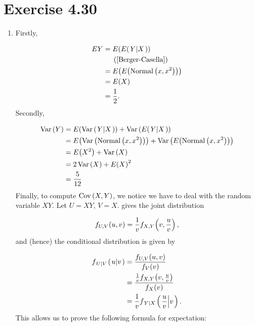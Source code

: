 \documentclass[12pt,letterpaper,reqno]{amsart}
\numberwithin{equation}{subsection}
\begin{document}
\newpage
\section{Exercise 4.30}

\begin{enumerate}[label=(\alph*),leftmargin=*]
    \item Firstly,
    
    \begin{align*}
        EY &= \fun{E}{\fun{E}{\conditbar{Y}{X}}} \\
        & \ \ \ \ \left( \mbox{\cite[Theorem 4.4.3 on page 164]{Berger-Casella}} \right) \\
        &= \fun{E}{\fun{E}{\normaldist{x,x^2}}} \\
        &= \fun{E}{X} \\
        &= \frac{1}{2}.
    \end{align*}
Secondly,

    \begin{align*}
        \operatorname{Var}\left( {Y} \right) &= {E}\! \left( {\operatorname{Var}\left( {\left. {Y} \middle| {X} \right.} \right)} \right) + \operatorname{Var}\left( {{E}\! \left( {\left. {Y} \middle| {X} \right.} \right)} \right) \\
        &= {E}\! \left( {\operatorname{Var}\left( {\operatorname{Normal}\left( {x,x^2} \right)} \right)} \right) + \operatorname{Var}\left( {{E}\! \left( {\operatorname{Normal}\left( {x, x^2} \right)} \right)} \right) \\
        &= {E}\! \left( {X^2} \right) + \operatorname{Var}\left( {X} \right) \\
        &= 2 \operatorname{Var}\left( {X} \right) + {E}\! \left( {X} \right)^2 \\
        &= \frac{5}{12}
    \end{align*}
Finally, to compute $\operatorname{Cov}\left( {X,Y} \right)$, we notice we have to deal with the random variable $XY$. Let $U = XY$, $V = X$. \cite[page 158]{Berger-Casella} gives the joint distribution

\begin{equation}
    {f_{U,V}}\! \left( {u,v} \right) = \frac{1}{v} {f_{X,Y}}\! \left( {v, \frac{u}{v}} \right),
\end{equation}
and (hence) the conditional distribution is given by

\begin{align}
    {f_{ \left. {U} \middle| {V} \right.}}\! \left( {\left. {u} \middle| {v} \right.} \right) &= \frac{{f_{U,V}}\! \left( {u,v} \right)}{{f_V}\! \left( {v} \right)} \nonumber \\
                              &= \frac{\frac{1}{v} {f_{X,Y}}\! \left( {v, \frac{u}{v}} \right)}{{f_X}\! \left( {v} \right)} \nonumber \\
                              &= \frac{1}{v} {f_{\left. {Y} \middle| {X} \right.}}\! \left( {\left. {\frac{u}{v}} \middle| {v} \right.} \right).
\end{align}
This allows us to prove the following formula for expectation:


\end{enumerate}
\end{document}
